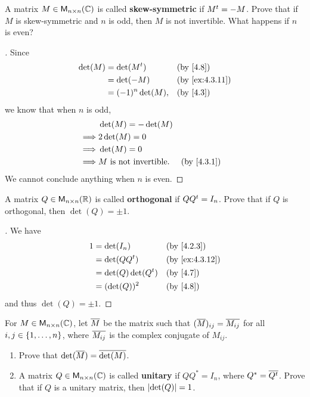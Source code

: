 \begin{ex}\label{ex:4.3.11}
	A matrix \(M \in \ms[n][n][\C]\) is called \textbf{skew-symmetric} if \({M}^{t} = -M\).
	Prove that if \(M\) is skew-symmetric and \(n\) is odd, then \(M\) is not invertible.
	What happens if \(n\) is even?
\end{ex}

\begin{proof}[]
	Since
	\begin{align*}
		\det(M) & = \det(\tp{M})    &  & \by{4.8}       \\
		        & = \det(-M)        &  & \by{ex:4.3.11} \\
		        & = (-1)^n \det(M), &  & \by{4.3}
	\end{align*}
	we know that when \(n\) is odd,
	\begin{align*}
		         & \det(M) = -\det(M)                           \\
		\implies & 2 \det(M) = 0                                \\
		\implies & \det(M) = 0                                  \\
		\implies & M \text{ is not invertible}. &  & \by{4.3.1}
	\end{align*}
	We cannot conclude anything when \(n\) is even.
\end{proof}

\begin{ex}\label{ex:4.3.12}
	A matrix \(Q \in \ms[n][n][\R]\) is called \textbf{orthogonal} if \(Q {Q}^{t} = I_n\).
	Prove that if \(Q\) is orthogonal, then \(\det(Q) = \pm 1\).
\end{ex}

\begin{proof}[]
	We have
	\begin{align*}
		1 & = \det(I_n)            &  & \by{4.2.3}     \\
		  & = \det(Q \tp{Q})       &  & \by{ex:4.3.12} \\
		  & = \det(Q) \det(\tp{Q}) &  & \by{4.7}       \\
		  & = (\det(Q))^2          &  & \by{4.8}
	\end{align*}
	and thus \(\det(Q) = \pm 1\).
\end{proof}

\begin{ex}\label{ex:4.3.13}
	For \(M \in \ms[n][n][\C]\), let \(\overline{M}\) be the matrix such that \((\overline{M})_{i j} = \overline{M_{i j}}\) for all \(i, j \in \left\lbrace1, \dots, n\right\rbrace\), where \(\overline{M_{i j}}\) is the complex conjugate of \(M_{i j}\).
	\begin{enumerate}
		\item Prove that \(\det(\overline{M}) = \overline{\det(M)}\).
		\item A matrix \(Q \in \ms[n][n][\C]\) is called \textbf{unitary} if \(Q Q^* = I_n\), where \(Q^* = \overline{{Q}^{t}}\).
		      Prove that if \(Q\) is a unitary matrix, then \(\left\lvert\det(Q)\right\rvert = 1\).
	\end{enumerate}
\end{ex}

